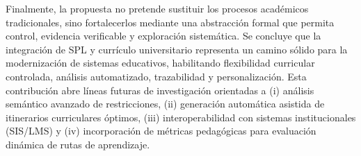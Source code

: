 {    Finalmente, la propuesta no pretende sustituir los procesos académicos 
    tradicionales, sino fortalecerlos mediante una abstracción formal que permita 
    control, evidencia verificable y exploración sistemática. Se concluye que la 
    integración de \ac{SPL} y currículo universitario representa un camino sólido 
    para la modernización de sistemas educativos, habilitando flexibilidad curricular 
    controlada, análisis automatizado, trazabilidad y personalización. Esta 
    contribución abre líneas futuras de investigación orientadas a (i) análisis
    semántico avanzado de restricciones, (ii) generación automática asistida de 
    itinerarios curriculares óptimos, (iii) interoperabilidad con sistemas 
    institucionales (\ac{SIS}/\ac{LMS}) y (iv) incorporación de métricas pedagógicas 
    para evaluación dinámica de rutas de aprendizaje.

}
